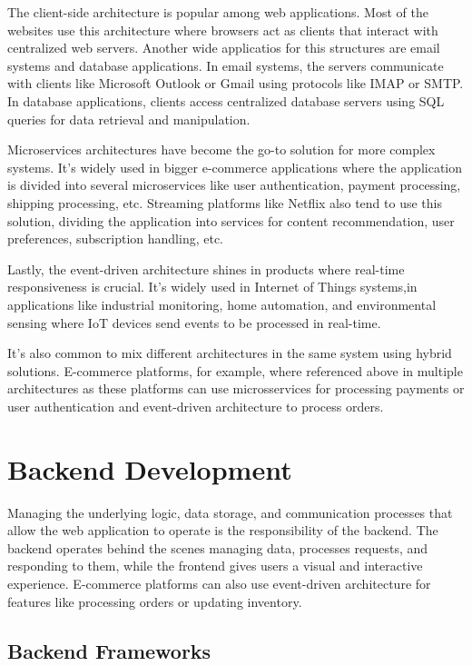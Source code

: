 The client-side architecture is popular among web applications. Most of the
websites use this architecture where browsers act as clients that interact with
centralized web servers. Another wide applicatios for this structures are email
systems and database applications. In email systems, the servers communicate
with clients like Microsoft Outlook or Gmail using protocols like IMAP or SMTP.
In database applications, clients access centralized database servers using
SQL queries for data retrieval and manipulation.

Microservices architectures have become the go-to solution for more complex
systems. It's widely used in bigger e-commerce applications where the application
is divided into several microservices like user authentication, payment processing,
shipping processing, etc. Streaming platforms like Netflix also tend to use this
solution, dividing the application into services for content recommendation, user
preferences, subscription handling, etc.

Lastly, the event-driven architecture shines in products where real-time
responsiveness is crucial. It's widely used in Internet of Things systems,in
applications like industrial monitoring, home automation, and environmental
sensing where IoT devices send events to be processed in real-time.

It's also common to mix different architectures in the same system using
hybrid solutions. E-commerce platforms, for example, where referenced above in
multiple architectures as these platforms can use microsservices for processing
payments or user authentication and event-driven architecture to process orders.

\section{Backend Development}
Managing the underlying logic, data storage, and communication processes that
allow the web application to operate is the responsibility of the backend.
The backend operates behind the scenes managing data, processes requests, and
responding to them, while the frontend gives users a visual and interactive
experience. E-commerce platforms can also use event-driven architecture for
features like processing orders or updating inventory.

\subsection{Backend Frameworks}
